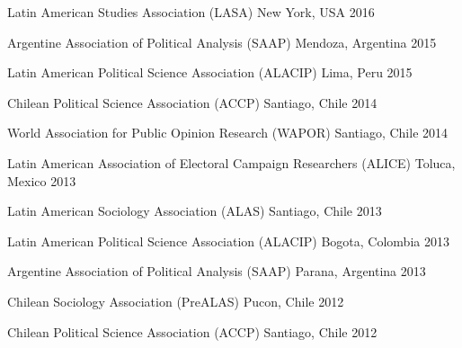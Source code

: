 \begin{cvhonors}
\cvconf
{Latin American Studies Association (LASA)} 
{New York, USA}
{2016}
\end{cvhonors}

\begin{cvhonors}
\cvconf
{Argentine Association of Political Analysis (SAAP)} 
{Mendoza, Argentina}
{2015}
\end{cvhonors}

\begin{cvhonors}
\cvconf
{Latin American Political Science Association (ALACIP)} 
{Lima, Peru}
{2015}
\end{cvhonors}

\begin{cvhonors}
\cvconf
{Chilean Political Science Association (ACCP)} 
{Santiago, Chile}
{2014}
\end{cvhonors}

\begin{cvhonors}
\cvconf
{World Association for Public Opinion Research (WAPOR)} 
{Santiago, Chile}
{2014}
\end{cvhonors}

\begin{cvhonors}
\cvconf
{Latin American Association of Electoral Campaign Researchers (ALICE)} 
{Toluca, Mexico}
{2013}
\end{cvhonors}

\begin{cvhonors}
\cvconf
{Latin American Sociology Association (ALAS)} 
{Santiago, Chile}
{2013}
\end{cvhonors}

\begin{cvhonors}
\cvconf
{Latin American Political Science Association (ALACIP)} 
{Bogota, Colombia}
{2013}
\end{cvhonors}

\begin{cvhonors}
\cvconf
{Argentine Association of Political Analysis (SAAP)} 
{Parana, Argentina}
{2013}
\end{cvhonors}

\begin{cvhonors}
\cvconf
{Chilean Sociology Association (PreALAS)} 
{Pucon, Chile}
{2012}
\end{cvhonors}

\begin{cvhonors}
\cvconf
{Chilean Political Science Association (ACCP)} 
{Santiago, Chile}
{2012}
\end{cvhonors}

